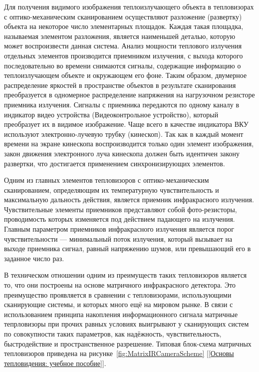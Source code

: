 \documentclass[14pt, a4paper]{extreport}
\begin{document}
	Для получения видимого изображения теплоизлучающего объекта в тепловизорах с оптико-механическим сканированием осуществляют разложение (развертку) объекта на некоторое число элементарных площадок. Каждая такая площадка, называемая элементом разложения, является наименьшей деталью, которую может воспроизвести данная система. Анализ мощности теплового излучения отдельных элементов производится приемником излучения, с выхода которого последовательно во времени снимаются сигналы, содержащие информацию о теплоизлучающем объекте и окружающем его фоне. Таким образом, двумерное распределение яркостей в пространстве объектов в результате сканирования преобразуется в одномерное распределение напряжения на нагрузочном резисторе приемника излучения. Сигналы с приемника передаются по одному каналу в индикатор видео устройства (Видеоконтрольное устройство), который преобразует их в видимое изображение. Чаще всего в качестве индикатора ВКУ используют электронно-лучевую трубку (кинескоп). Так как в каждый момент времени на экране кинескопа воспроизводится только один элемент изображения, закон движения электронного луча кинескопа должен быть идентичен закону развертки, что достигается применением синхронизирующих элементов.
	
	Одним из главных элементов тепловизоров с оптико-механическим сканированием, определяющим их температурную чувствительность и максимальную дальность действия, является приемник инфракрасного излучения. Чувствительные элементы приемников представляют собой фото-резисторы, проводимость которых изменяется под действием падающего на излучения. Главным параметром приемников инфракрасного излучения является порог чувствительности — минимальный поток излучения, который вызывает на выходе приемника сигнал, равный напряжению шумов, или превышающий его в заданное число раз.
	
	В техническом отношении одним из преимуществ таких тепловизоров является то, что они построены на основе матричного инфракрасного детектора. Это преимущество проявляется в сравнении с тепловизорами, использующими сканирующие системы, и которых много ещё на мировом рынке. В связи с использованием принципа накопления информационного сигнала матричные тепрловизоры при прочих равных условиях выигрывают у сканирующих систем по совокупности таких параметров, как надёжность, чувствительность, быстродействие и пространственное разрешение. Типовая блок-схема матричных тепловизоров приведена на рисунке~\ref{fig:MatrixIRCameraScheme} [\ref{Основы тепловидения: учебное пособие}].
	
\end{document}
